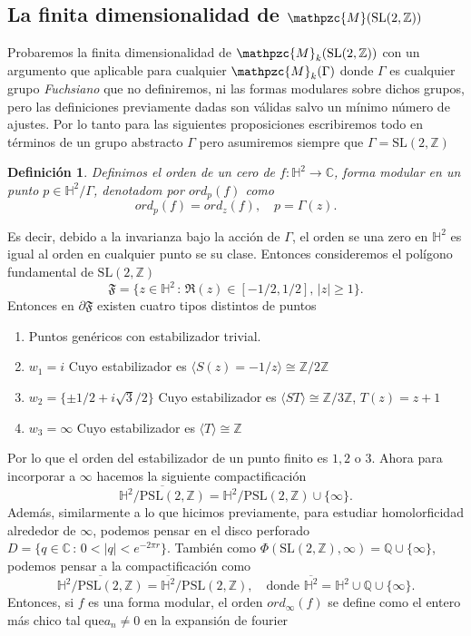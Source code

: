 \documentclass[letterpaper]{article}
\newtheorem{def.}{Definici\'on}[section]
\newcommand{\zah}{\ensuremath{ \mathbb Z }}
\newcommand{\rac}{\ensuremath{ \mathbb Q }}
\newcommand{\ga}{\ensuremath{\Gamma}}
\newcommand{\co}{\ensuremath{\mathbb C }}
\newcommand{\slz}{\ensuremath{\mathrm{SL}(2,\mathbb Z) }}
\newcommand{\pslz}{\ensuremath{\mathrm{PSL}(2,\mathbb Z) }}
\newcommand{\hd}{\ensuremath{\mathbb H^2}}
\newcommand{\mdlr}{\ensuremath{\mathpzc{M}}}
\begin{document}
\subsection{La finita dimensionalidad de \(\mdlr(\slz)\)}
\label{sec:org9367fa3}
\noindent Probaremos la finita dimensionalidad de \(\mdlr_{k}(\slz)\) con un argumento que aplicable para cualquier \(\mdlr_{k}(\ga)\) donde \(\ga\) es cualquier grupo \emph{Fuchsiano} que no definiremos, ni las formas modulares sobre dichos grupos, pero las definiciones previamente dadas son válidas salvo un mínimo número de ajustes. Por lo tanto para las siguientes proposiciones escribiremos todo en términos de un grupo abstracto \(\ga\) pero asumiremos siempre que \(\ga=\slz\)
\begin{def.}
Definimos el orden de un cero de \(f:\hd\rightarrow\co\), forma modular en un punto \(p\in\hd/\ga\), denotadom por \(ord_p(f)\) como
\[
 ord_p(f)=ord_z(f),\quad p=\ga(z).
\]
\end{def.}
Es decir, debido a la invarianza bajo la acción de \(\ga\), el orden se una zero en \(\hd\) es igual al orden en cualquier punto se su clase.
Entonces consideremos el polígono fundamental de \(\slz\)
\[
    \mathfrak{F}=\{z\in\hd\,:\, \Re(z)\in[-1/2,1/2],\,|z|\geq 1\}.
\]
\noindent Entonces en \(\partial\mathfrak{F}\) existen cuatro tipos distintos de puntos
\begin{enumerate}
\item Puntos genéricos con estabilizador trivial.
\item \(w_1=i\) Cuyo estabilizador es \(\langle S(z)=-1/z \rangle\cong\zah/2\zah\)
\item \(w_2=\{\pm 1/2+i\sqrt{3}/2\}\) Cuyo estabilizador es  \(\langle ST \rangle\cong\zah/3\zah\), \(T(z)=z+1\)
\item \(w_3=\infty\) Cuyo estabilizador es \(\langle T\rangle\cong\zah\)
\end{enumerate}
Por lo que el orden del estabilizador de un punto finito es \(1,2\) o \(3\). Ahora para incorporar a \(\infty\) hacemos la siguiente compactificación
\[
    \overline{\hd/\pslz}=\hd/\pslz\cup\{\infty\}.
\]
Además, similarmente a lo que hicimos previamente, para estudiar homolorficidad alrededor de \(\infty\), podemos pensar en el disco perforado \(D=\{q\in\co\,:\,0<|q|<e^{-2\pi r}\}\). También como \(\Phi(\slz,\infty)=\rac\cup\{\infty\}\), podemos pensar a la compactificación como
\[
    \overline{\hd/\pslz}=\overline{\hd}/\pslz,\quad\text{donde }\overline{\hd}=\hd\cup\rac\cup\{\infty\}.
\]
Entonces, si \(f\) es una forma modular, el orden \(ord_{\infty}(f)\) se define como el entero más chico tal que\(a_n\neq0\) en la expansión de fourier
\end{document}
